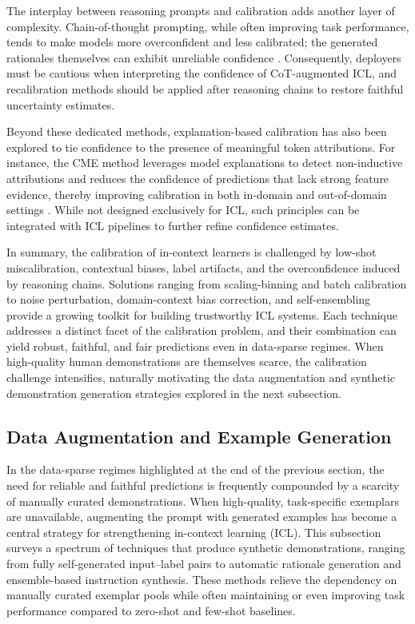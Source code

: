 \documentclass[11pt]{article}
\begin{document}
The interplay between reasoning prompts and calibration adds another layer of complexity. Chain-of-thought prompting, while often improving task performance, tends to make models more overconfident and less calibrated; the generated rationales themselves can exhibit unreliable confidence \cite{ref88}. Consequently, deployers must be cautious when interpreting the confidence of CoT-augmented ICL, and recalibration methods should be applied after reasoning chains to restore faithful uncertainty estimates.

Beyond these dedicated methods, explanation-based calibration has also been explored to tie confidence to the presence of meaningful token attributions. For instance, the CME method leverages model explanations to detect non-inductive attributions and reduces the confidence of predictions that lack strong feature evidence, thereby improving calibration in both in-domain and out-of-domain settings \cite{ref93}. While not designed exclusively for ICL, such principles can be integrated with ICL pipelines to further refine confidence estimates.

In summary, the calibration of in-context learners is challenged by low-shot miscalibration, contextual biases, label artifacts, and the overconfidence induced by reasoning chains. Solutions ranging from scaling-binning and batch calibration to noise perturbation, domain-context bias correction, and self-ensembling provide a growing toolkit for building trustworthy ICL systems. Each technique addresses a distinct facet of the calibration problem, and their combination can yield robust, faithful, and fair predictions even in data-sparse regimes. When high-quality human demonstrations are themselves scarce, the calibration challenge intensifies, naturally motivating the data augmentation and synthetic demonstration generation strategies explored in the next subsection.

\subsection{Data Augmentation and Example Generation}

In the data-sparse regimes highlighted at the end of the previous section, the need for reliable and faithful predictions is frequently compounded by a scarcity of manually curated demonstrations. When high-quality, task-specific exemplars are unavailable, augmenting the prompt with generated examples has become a central strategy for strengthening in-context learning (ICL). This subsection surveys a spectrum of techniques that produce synthetic demonstrations, ranging from fully self-generated input--label pairs to automatic rationale generation and ensemble-based instruction synthesis. These methods relieve the dependency on manually curated exemplar pools while often maintaining or even improving task performance compared to zero-shot and few-shot baselines.
\end{document}
